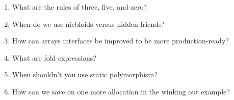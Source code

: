 \begin{enumerate}
\item
What are the rules of three, five, and zero?

\item
When do we use niebloids versus hidden friends?

\item
How can arrays interfaces be improved to be more production-ready?

\item
What are fold expressions?

\item
When shouldn't you use static polymorphism?

\item
How can we save on one more allocation in the winking out example?
\end{enumerate}